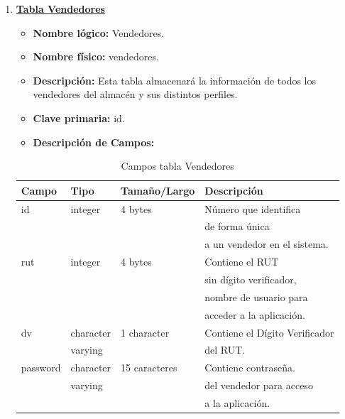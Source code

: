 \documentclass[letterpaper,12pt]{article}
\begin{document}
\begin{enumerate}
\item \textbf{\underline{Tabla Vendedores}}
\begin{itemize}
\item \textbf{Nombre lógico:} Vendedores.
\item \textbf{Nombre físico:} vendedores.
\item \textbf{Descripción:} Esta tabla almacenará la información de todos los vendedores del almacén y sus distintos perfiles.
\item \textbf{Clave primaria:} id.
\item \textbf{Descripción de Campos:}
\end{itemize}

\begin{table}[!ht]
\caption{Campos tabla Vendedores}
\begin{center}
\begin{tabular}{|l|l|l|l|}
\hline
\textbf{Campo} \hspace*{2cm} & \textbf{Tipo} & \textbf{Tamaño/Largo} & \textbf{Descripción} \hspace*{3cm} \\
\hline
id & integer & 4 bytes& Número que identifica\\ 
\mbox{} & \mbox{} & & de forma única \\
\mbox{} & \mbox{} & & a un vendedor en el sistema.\\
\hline
rut & integer & 4 bytes & Contiene el RUT\\
\mbox{} & \mbox{} & & sin dígito verificador,\\
\mbox{} & \mbox{} & & nombre de usuario para\\
\mbox{} & \mbox{} & & acceder a la aplicación.\\
\hline
dv & character & 1 character& Contiene el Dígito Verificador\\
\mbox{} & varying & & del RUT.\\
\hline
password & character & 15 caracteres & Contiene contraseña.\\
\mbox{} & varying & & del vendedor para acceso\\
\mbox{} & \mbox{} & & a la aplicación.\\
\hline

\end{tabular}
\end{center}
\end{table}



\end{enumerate}
\end{document}
